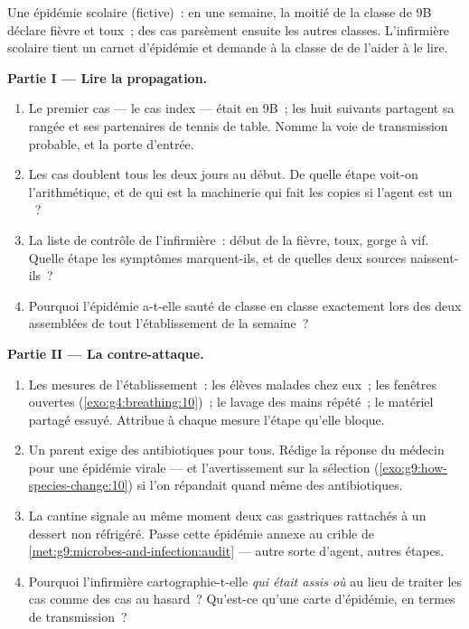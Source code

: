 \begin{problem}\label{pb:g9:microbes-and-infection:1}
Une épidémie scolaire (fictive)~: en une semaine, la moitié
de la classe de 9B déclare fièvre et toux~; des cas
parsèment ensuite les autres classes. L'infirmière scolaire
tient un carnet d'épidémie et demande à la classe de
 de l'aider à le lire.

\medskip\noindent\textbf{Partie I --- Lire la propagation.}
\begin{enumerate}
  \item Le premier cas --- le cas index --- était en 9B~;
        les huit suivants partagent sa rangée et ses
        partenaires de tennis de table. Nomme la voie de
        transmission probable, et la porte d'entrée.
  \item Les cas doublent tous les deux jours au début. De
        quelle étape voit-on l'arithmétique, et de qui est
        la machinerie qui fait les copies si l'agent est un
        ~?
  \item La liste de contrôle de l'infirmière~: début de la
        fièvre, toux, gorge à vif. Quelle étape les
        symptômes marquent-ils, et de quelles deux sources
        naissent-ils~?
  \item Pourquoi l'épidémie a-t-elle sauté de classe en
        classe exactement lors des deux assemblées de tout
        l'établissement de la semaine~?
\end{enumerate}

\medskip\noindent\textbf{Partie II --- La contre-attaque.}
\begin{enumerate}[resume]
  \item Les mesures de l'établissement~: les élèves malades
        chez eux~; les fenêtres ouvertes
        (\cref{exo:g4:breathing:10})~; le lavage des mains
        répété~; le matériel partagé essuyé. Attribue à
        chaque mesure l'étape qu'elle bloque.
  \item Un parent exige des antibiotiques pour tous. Rédige
        la réponse du médecin pour une épidémie virale ---
        et l'avertissement sur la sélection
        (\cref{exo:g9:how-species-change:10}) si l'on
        répandait quand même des antibiotiques.
  \item La cantine signale au même moment deux cas
        gastriques rattachés à un dessert non réfrigéré.
        Passe cette épidémie annexe au crible de
        \cref{met:g9:microbes-and-infection:audit} ---
        autre sorte d'agent, autres étapes.
  \item Pourquoi l'infirmière cartographie-t-elle
        \emph{qui était assis où} au lieu de traiter les
        cas comme des cas au hasard~? Qu'est-ce qu'une
        carte d'épidémie, en termes de transmission~?
\end{enumerate}


\end{problem}
